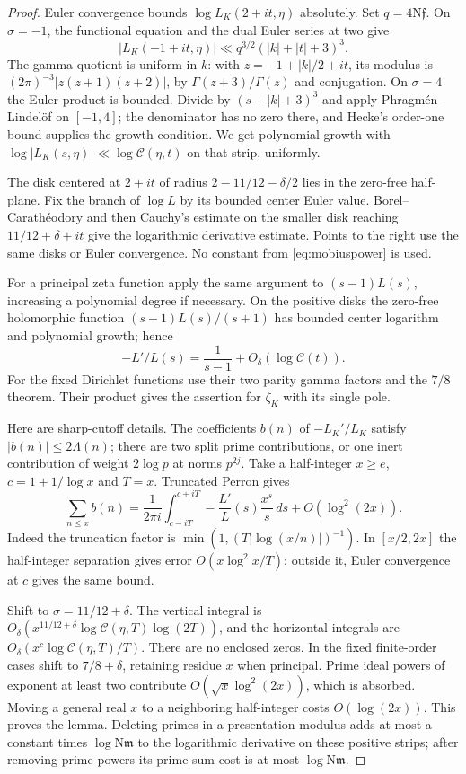 \documentclass[11pt,a4paper]{article}
\numberwithin{equation}{section}
\theoremstyle{definition}
\theoremstyle{remark}
\newcommand{\N}{\mathrm N}
\newcommand{\dd}{\,d}
\begin{document}
\begin{proof}
Euler convergence bounds $\log L_K(2+it,\eta)$ absolutely. Set $q=4\N\mathfrak f$. On $\sigma=-1$, the functional equation and the dual Euler series at two give
\[
 |L_K(-1+it,\eta)|\ll q^{3/2}(|k|+|t|+3)^3.
\]
The gamma quotient is uniform in $k$: with $z=-1+|k|/2+it$, its modulus is
$(2\pi)^{-3}|z(z+1)(z+2)|$, by $\Gamma(z+3)/\Gamma(z)$ and conjugation. On $\sigma=4$ the Euler product is bounded. Divide by $(s+|k|+3)^3$ and apply Phragm\'en--Lindel\"of on $[-1,4]$; the denominator has no zero there, and Hecke's order-one bound supplies the growth condition. We get polynomial growth with
$\log|L_K(s,\eta)|\ll\log\mathcal C(\eta,t)$ on that strip, uniformly.

The disk centered at $2+it$ of radius $2-11/12-\delta/2$ lies in the zero-free half-plane. Fix the branch of $\log L$ by its bounded center Euler value. Borel--Carath\'eodory and then Cauchy's estimate on the smaller disk reaching $11/12+\delta+it$ give the logarithmic derivative estimate. Points to the right use the same disks or Euler convergence. No constant from \eqref{eq:mobiuspower} is used.

For a principal zeta function apply the same argument to $(s-1)L(s)$, increasing a polynomial degree if necessary. On the positive disks the zero-free holomorphic function $(s-1)L(s)/(s+1)$ has bounded center logarithm and polynomial growth; hence
\[
 -L'/L(s)=\frac1{s-1}+O_\delta(\log\mathcal C(t)).
\]
For the fixed Dirichlet functions use their two parity gamma factors and the $7/8$ theorem. Their product gives the assertion for $\zeta_K$ with its single pole.

Here are sharp-cutoff details. The coefficients $b(n)$ of $-L_K'/L_K$ satisfy $|b(n)|\le2\Lambda(n)$; there are two split prime contributions, or one inert contribution of weight $2\log p$ at norms $p^{2j}$. Take a half-integer $x\ge e$, $c=1+1/\log x$ and $T=x$. Truncated Perron gives
\[
 \sum_{n\le x}b(n)=\frac1{2\pi i}\int_{c-iT}^{c+iT}
          -\frac{L'}L(s)\frac{x^s}{s}\dd s+O(\log^2(2x)).
\]
Indeed the truncation factor is $\min(1,(T|\log(x/n)|)^{-1})$. In $[x/2,2x]$ the half-integer separation gives error $O(x\log^2x/T)$; outside it, Euler convergence at $c$ gives the same bound.

Shift to $\sigma=11/12+\delta$. The vertical integral is
$O_\delta(x^{11/12+\delta}\log\mathcal C(\eta,T)\log(2T))$,
and the horizontal integrals are $O_\delta(x^c\log\mathcal C(\eta,T)/T)$.
There are no enclosed zeros. In the fixed finite-order cases shift to $7/8+\delta$, retaining residue $x$ when principal. Prime ideal powers of exponent at least two contribute $O(\sqrt x\log^2(2x))$, which is absorbed. Moving a general real $x$ to a neighboring half-integer costs $O(\log(2x))$. This proves the lemma. Deleting primes in a presentation modulus adds at most a constant times $\log\N\mathfrak m$ to the logarithmic derivative on these positive strips; after removing prime powers its prime sum cost is at most $\log\N\mathfrak m$.
\end{proof}
\end{document}
